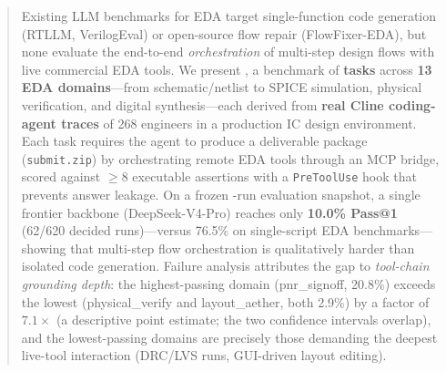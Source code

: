 \begin{abstract}
Existing LLM benchmarks for EDA target single-function code generation (RTLLM, VerilogEval) or open-source flow repair (FlowFixer-EDA), but none evaluate the end-to-end \emph{orchestration} of multi-step design flows with live commercial EDA tools.
We present \bench, a benchmark of \textbf{\Ntasks{} tasks} across \textbf{13 EDA domains}---from schematic/netlist to SPICE simulation, physical verification, and digital synthesis---each derived from \textbf{real Cline coding-agent traces} of 268 engineers in a production IC design environment.
Each task requires the agent to produce a deliverable package (\texttt{submit.zip}) by orchestrating remote EDA tools through an MCP bridge, scored against $\geq 8$ executable assertions with a \texttt{PreToolUse} hook that prevents answer leakage.
On a frozen \Neval{}-run evaluation snapshot, a single frontier backbone (DeepSeek-V4-Pro) reaches only \textbf{10.0\% Pass@1} (62/620 decided runs)---versus 76.5\% on single-script EDA benchmarks---showing that multi-step flow orchestration is qualitatively harder than isolated code generation.
Failure analysis attributes the gap to \emph{tool-chain grounding depth}: the highest-passing domain (pnr\_signoff, 20.8\%) exceeds the lowest (physical\_verify and layout\_aether, both 2.9\%) by a factor of $7.1\times$ (a descriptive point estimate; the two confidence intervals overlap), and the lowest-passing domains are precisely those demanding the deepest live-tool interaction (DRC/LVS runs, GUI-driven layout editing).
\end{abstract}
